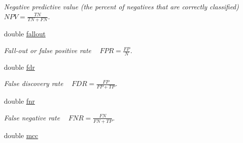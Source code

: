 \begin{DoxyCompactItemize}
\begin{DoxyCompactList}\small\item\em Negative predictive value (the percent of negatives that are correctly classified) ~\newline
 $ NPV = \frac{TN}{TN+FN} $. \end{DoxyCompactList}\item 
\hypertarget{struct_vision_core_1_1_evaluation_1_1_binary_classifier_eval_result_abc38975fd884497b24f52b828cec9f1b}{}double \hyperlink{struct_vision_core_1_1_evaluation_1_1_binary_classifier_eval_result_abc38975fd884497b24f52b828cec9f1b}{fallout}\label{struct_vision_core_1_1_evaluation_1_1_binary_classifier_eval_result_abc38975fd884497b24f52b828cec9f1b}

\begin{DoxyCompactList}\small\item\em Fall-\/out or false positive rate ~\newline
 $ FPR = \frac{FP}{N} $. \end{DoxyCompactList}\item 
\hypertarget{struct_vision_core_1_1_evaluation_1_1_binary_classifier_eval_result_a4b55320813a56a9e113b23525e17f574}{}double \hyperlink{struct_vision_core_1_1_evaluation_1_1_binary_classifier_eval_result_a4b55320813a56a9e113b23525e17f574}{fdr}\label{struct_vision_core_1_1_evaluation_1_1_binary_classifier_eval_result_a4b55320813a56a9e113b23525e17f574}

\begin{DoxyCompactList}\small\item\em False discovery rate ~\newline
 $ FDR = \frac{FP}{FP+TP} $. \end{DoxyCompactList}\item 
\hypertarget{struct_vision_core_1_1_evaluation_1_1_binary_classifier_eval_result_a2f9dbff026930716e4e219ce2d94b6f1}{}double \hyperlink{struct_vision_core_1_1_evaluation_1_1_binary_classifier_eval_result_a2f9dbff026930716e4e219ce2d94b6f1}{fnr}\label{struct_vision_core_1_1_evaluation_1_1_binary_classifier_eval_result_a2f9dbff026930716e4e219ce2d94b6f1}

\begin{DoxyCompactList}\small\item\em False negative rate ~\newline
 $ FNR = \frac{FN}{FN + TP} $. \end{DoxyCompactList}\item 
\hypertarget{struct_vision_core_1_1_evaluation_1_1_binary_classifier_eval_result_a71afe1789388eaf7cf65d0de39800e5d}{}double \hyperlink{struct_vision_core_1_1_evaluation_1_1_binary_classifier_eval_result_a71afe1789388eaf7cf65d0de39800e5d}{mcc}\label{struct_vision_core_1_1_evaluation_1_1_binary_classifier_eval_result_a71afe1789388eaf7cf65d0de39800e5d}


\end{DoxyCompactItemize}
